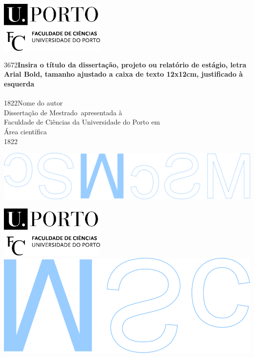 \documentclass[11pt]{article}
\makeatletter
\newcommand\HUGE{\@setfontsize\Huge{36}{72}}
\newcommand\LargeA{\@setfontsize\Large{18}{22}}
\newcommand*{\ttitle}{Insira o título da dissertação, projeto ou relatório de estágio, letra Arial Bold, tamanho ajustado a caixa de texto 12x12cm, justificado à esquerda}
\newcommand*{\authorname}{Nome do autor}
\newcommand*{\ttype}{Mestrado}
\newcommand*{\fieldname}{Área científica}
\makeatother
\begin{document}
\hspace{1.5cm}
\begin{minipage}[b][12.5cm][b]{12.5cm}
	\begin{flushleft}
		\includegraphics[width=52mm]{fcup}
		\vspace{5cm}
	\end{flushleft}
	\begin{flushleft}
		\setstretch{2.6}
		{\HUGE \bfseries \ttitle} \\
		 {\large~\\}
		{\LargeA \authorname \\} 
		{\large Dissertação de \ttype~apresentada à \\}
		{\large Faculdade de Ciências da Universidade do Porto em \\}
		{\large \fieldname \\}
		{\LargeA \the\year \\}
		\vspace{3cm}
	\end{flushleft}
\end{minipage}%
\hspace{\fill}
\begin{minipage}[b][297mm][b]{54.3mm}
	\includegraphics[scale=0.97]{msc2}
\end{minipage}

\newpage



\raggedright
\begin{minipage}[b][297mm][b]{54.3mm}
	\raggedleft
	\includegraphics[width=52mm]{fcup}
	~\\[0.8cm]
	\includegraphics[scale=0.97]{mscmirror}
\end{minipage}

\newpage
\end{document}
